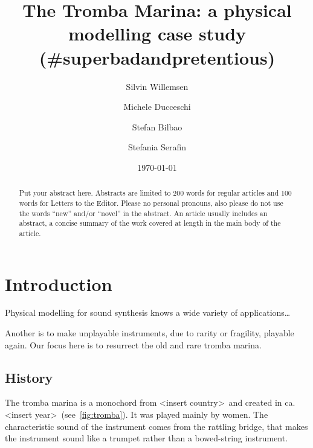 \documentclass[reprint,NumberedRefs]{JASAnew}
\begin{document}
\title[JASA/Sample JASA Article]{The Tromba Marina: a physical modelling case study (\#superbadandpretentious)}
\author{Silvin Willemsen}
\author{Michele Ducceschi}
\author{Stefan Bilbao}

\author{Stefania Serafin}
 


\date{\today} 

\begin{abstract}
Put your abstract here. Abstracts are limited to 200 words for
regular articles and 100 words for Letters to the Editor. Please no
personal pronouns, also please do not use the words ``new'' and/or
``novel'' in the abstract. An article usually includes an abstract, a
concise summary of the work covered at length in the main body of the
article.     
\end{abstract}


\maketitle



\section{\label{sec:1} Introduction}
Physical modelling for sound synthesis knows a wide variety of applications\dots

Another is to make unplayable instruments, due to rarity or fragility, playable again. Our focus here is to resurrect the old and rare tromba marina. 

\subsection{History}
The tromba marina is a monochord from  \textless insert country\textgreater\ and created in ca.  \textless insert year\textgreater\ (see~\ref{fig:tromba}). It was played mainly by women. The characteristic sound of the instrument comes from the rattling bridge, that makes the instrument sound like a trumpet rather than a bowed-string instrument. 
\end{document}
